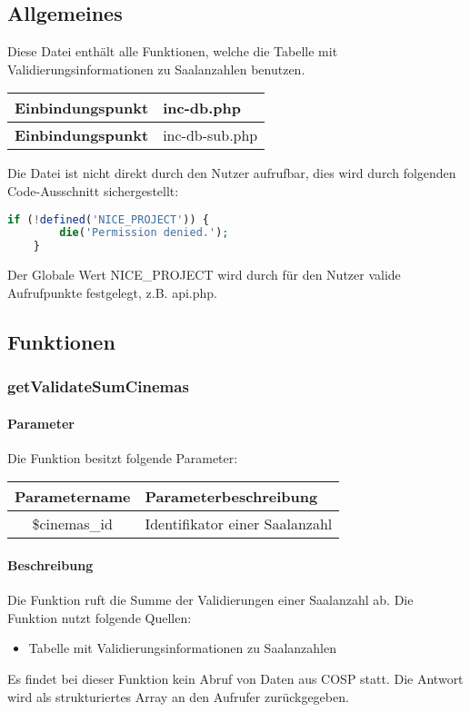 \subsection{Allgemeines} Diese Datei enthält alle Funktionen, welche die Tabelle mit Validierungsinformationen zu Saalanzahlen benutzen.
\begin{table}[H]
	\begin{tabular}{|c|p{11cm}|}
		\hline
		\textbf{Einbindungspunkt} & inc-db.php \\ \hline
		\textbf{Einbindungspunkt} & inc-db-sub.php \\ \hline
	\end{tabular}
\end{table}
Die Datei ist nicht direkt durch den Nutzer aufrufbar, dies wird durch folgenden Code-Ausschnitt sichergestellt:
\begin{lstlisting}[language=php]
	if (!defined('NICE_PROJECT')) {
		die('Permission denied.');
	}
\end{lstlisting}
Der Globale Wert {\glqq NICE\_PROJECT\grqq} wird durch für den Nutzer valide Aufrufpunkte festgelegt, z.B. {\glqq api.php\grqq}.
\newpage
\subsection{Funktionen}
\subsubsection{getValidateSumCinemas}
\paragraph{Parameter} Die Funktion besitzt folgende Parameter:
\begin{table}[H]
	\begin{tabular}{|c|p{11cm}|}
		\hline
		\textbf{Parametername} & \textbf{Parameterbeschreibung} \\ \hline
		\$cinemas\_id & Identifikator einer Saalanzahl \\ \hline
	\end{tabular}
\end{table}
\paragraph{Beschreibung} Die Funktion ruft die Summe der Validierungen einer Saalanzahl ab. Die Funktion nutzt folgende Quellen:
\begin{itemize}
	\item Tabelle mit Validierungsinformationen zu Saalanzahlen
\end{itemize}
Es findet bei dieser Funktion kein Abruf von Daten aus {\glqq COSP\grqq} statt. Die Antwort wird als strukturiertes Array an den Aufrufer zurückgegeben.
